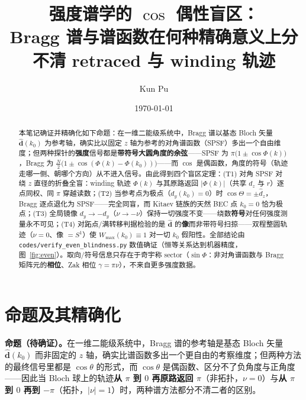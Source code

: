 \documentclass[onecolumn,aps,prl,superscriptaddress,longbibliography]{revtex4-2}
\begin{document}
\title{强度谱学的 $\cos$ 偶性盲区：\\Bragg 谱与谱函数在何种精确意义上分不清 retraced 与 winding 轨迹}
\author{Kun Pu}
\date{\today}

\begin{abstract}
本笔记确证并精确化如下命题：在一维二能级系统中，Bragg 谱以基态 Bloch 矢量 $\hat{\mathbf{d}}(k_0)$ 为参考轴，确实比以固定 $z$ 轴为参考的对角谱函数（SPSF）多出一个自由维度；但两种探针的\textbf{强度}信号都是\textbf{带符号大圆角度的余弦}——SPSF 为 $\pi\big(1\pm\cos\Phi(k)\big)$，Bragg 为 $\tfrac{N}{2}\big(1\pm\cos(\Phi(k)-\Phi(k_0))\big)$——而 $\cos$ 是偶函数，角度的符号（轨迹走哪一侧、朝哪个方向）从不进入信号。由此得到四个盲区定理：(T1) 对角 SPSF 对绕 $z$ 直径的折叠全盲：winding 轨迹 $\Phi(k)$ 与其原路返回 $|\Phi(k)|$（共享 $d_z$ 与 $r$）逐点同权、同 $\pi$ 穿越读数；(T2) 当参考点为极点（$d_y(k_0)=0$）时 $\cos\Theta=\pm\hat d_z$，Bragg 逐点退化为 SPSF——完全同盲，而 Kitaev 链族的天然 BEC 点 $k_0=0$ 恰为极点；(T3) 全局镜像 $d_y\to-d_y$（$\nu\to-\nu$）保持一切强度不变——绕数\textbf{符号}对任何强度测量永不可见；(T4) 对跖点/满转移判据检验的是 $\hat{\mathbf{d}}$ 的\textbf{像}而非带符号扫掠——双程整圆轨迹（$\nu=0$、像 $=S^1$）使 $W_{\max}(k_0)\equiv1$ 对一切 $k_0$ 假阳性。全部结论由 \texttt{codes/verify\_even\_blindness.py} 数值确证（恒等关系达到机器精度，图~\ref{fig:even}）。取向/符号信息只存在于奇宇称 sector（$\sin\Phi$：非对角谱函数与 Bragg 矩阵元的\textbf{相位}、Zak 相位 $\gamma=\pi\nu$），不来自更多强度数据。
\end{abstract}

\maketitle

\section{命题及其精确化}\label{sec:claim}

\textbf{命题（待确证）。}在一维二能级系统中，Bragg 谱的参考轴是基态 Bloch 矢量 $\hat{\mathbf{d}}(k_0)$ 而非固定的 $z$ 轴，确实比谱函数多出一个更自由的考察维度；但两种方法的最终信号里都是 $\cos\theta$ 的形式，而 $\cos\theta$ 是偶函数、区分不了负角度与正角度——因此当 Bloch 球上的轨迹\textbf{从 $\pi$ 到 $0$ 再原路返回 $\pi$}（非拓扑，$\nu=0$）与\textbf{从 $\pi$ 到 $0$ 再到 $-\pi$}（拓扑，$|\nu|=1$）时，两种谱方法都分不清二者的区别。
\end{document}
